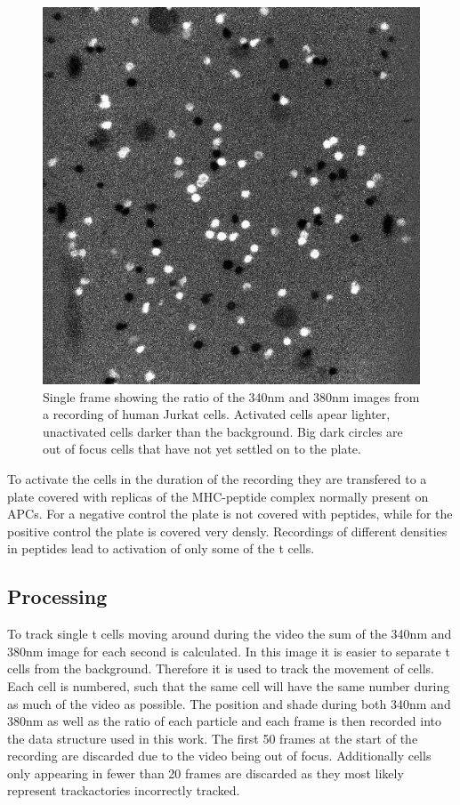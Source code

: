 \begin{figure}
	\centering
	\includegraphics[width=0.6\linewidth]{fig/frame_ratio.jpg}
	\caption{Single frame showing the ratio of the 340nm and 380nm images from a recording of human Jurkat cells. Activated cells apear lighter, unactivated cells darker than the background. Big dark circles are out of focus cells that have not yet settled on to the plate.}
	\label{fig:example_ratio_img}
\end{figure}

To activate the cells in the duration of the recording they are transfered to a plate covered with replicas of the MHC-peptide complex normally present on APCs. For a negative control the plate is not covered with peptides, while for the positive control the plate is covered very densly. Recordings of different densities in peptides lead to activation of only some of the t cells.

\subsection{Processing}

To track single t cells moving around during the video the sum of the 340nm and 380nm image for each second is calculated. In this image it is easier to separate t cells from the background. Therefore it is used to track the movement of cells. Each cell is numbered, such that the same cell will have the same number during as much of the video as possible. The position and shade during both 340nm and 380nm as well as the ratio of each particle and each frame is then recorded into the data structure used in this work. The first 50 frames at the start of the recording are discarded due to the video being out of focus. Additionally cells only appearing in fewer than 20 frames are discarded as they most likely represent trackactories incorrectly tracked.
